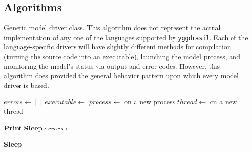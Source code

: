 \documentclass[journal]{IEEEtran}
\newcommand{\pkg}{{\tt yggdrasil}{}}
\begin{document}
\newpage
%
\begin{appendices}

\section{Algorithms}\label{A:algorithms}

\begin{algorithm}[H]
    \caption{Generic model driver class. This algorithm does not represent the actual implementation of any one of the languages supported by {\pkg}. Each of the language-specific drivers will have slightly different methods for compilation (turning the source code into an executable), launching the model process, and monitoring the model's status via output and error codes. However, this algorithm does provided the general behavior pattern upon which every model driver is based.}
    \label{alg:model}
    \begin{algorithmic}[1]
    	\State $errors \gets []$
    	\State $executable \gets$ 
	\State $process \gets$  on a new process
	\State $thread \gets$  on a new thread
	\item[]
		\State {}
	\EndClassMethod
	\item[]
				\State \textbf{Print} 
			\Else
				\State \textbf{Sleep}
			\EndIf
		\EndWhile
			\State $errors \gets$ 
		\EndIf
	\EndClassMethod
	\item[]
		\State {}
	\EndClassMethod
	\item[]
			\State \textbf{Sleep}
		\EndWhile
		\State {}
	\EndClassMethod
	\item[]
    \EndClass
    \end{algorithmic}
\end{algorithm}


\end{appendices}
\end{document}
